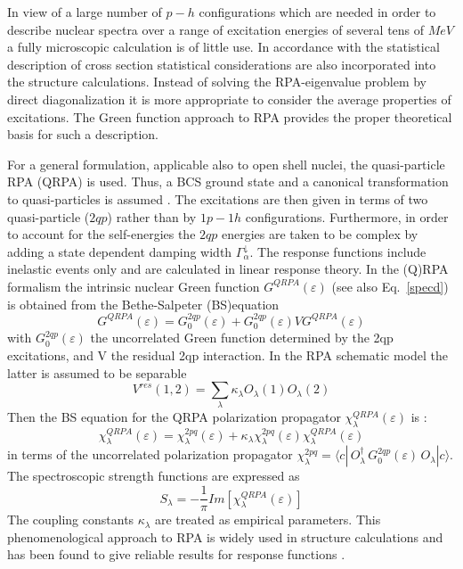 \documentclass[twocolumn,amsmath,amssymb,10pt,groupedaddress,a4paper]{revtex4}
\begin{document}
In view of a large number of $p-h$ configurations which are needed
in order to describe nuclear spectra over a range of excitation energies
of several tens of $MeV$ a fully microscopic calculation is of little
use. In accordance with the statistical description of cross section
statistical considerations are also incorporated into the structure
calculations. Instead of solving the RPA-eigenvalue problem
by direct diagonalization it is more appropriate to consider the average
properties of excitations. The Green function approach to RPA
\cite{Wal,LW92} provides the proper theoretical basis for such a
description.

For a general formulation, applicable also to open shell nuclei, the
quasi-particle RPA (QRPA) is used. Thus, a BCS ground
state and a canonical transformation to quasi-particles is assumed
\cite{RS}. The excitations are then given in terms of two quasi-particle
($2qp$) rather than by $1p-1h$ configurations. Furthermore, in order
to account for the self-energies the $2qp$ energies are taken to
be complex by adding a state dependent damping width $\Gamma_{\alpha}^{\downarrow}$.
The response functions include inelastic events only and are calculated
in linear response theory.
In the (Q)RPA formalism the intrinsic nuclear Green function $G^{QRPA}(\varepsilon)$ (see also Eq.~\ref{specd}) is obtained from the Bethe-Salpeter (BS)equation \cite{fetter}
\begin{equation}
G^{QRPA}(\varepsilon) = G_{0}^{2qp}(\varepsilon)+ G_{0}^{2qp}(\varepsilon)VG^{QRPA}(\varepsilon)\label{bs1}\end{equation}
with  $G_{0}^{2qp}(\varepsilon)$ the uncorrelated Green function determined by the 2qp excitations, and V the residual 2qp interaction. In the RPA schematic model the latter is assumed to be
separable \begin{equation}
V^{res}(1,2)=\sum_{\lambda}\kappa _{\lambda}O_{\lambda}(1)O_{\lambda}(2)
\end{equation}
Then the BS equation for the QRPA polarization propagator $\chi_{\lambda}^{QRPA}(\varepsilon)$
is \cite{TULnew}:
\begin{equation}
\chi_{\lambda}^{QRPA}(\varepsilon)=  \chi_{\lambda}^{2pq}(\varepsilon) + \kappa_{\lambda}\chi_{\lambda}^{2pq}(\varepsilon)\chi_{\lambda}^{QRPA}(\varepsilon)\label{bs2}
\end{equation}
in terms of the uncorrelated polarization propagator
$\chi_{\lambda}^{2pq} = \langle c|\,O_{\lambda}^{\dagger
}\,G_{0}^{2qp}(\varepsilon )\,O_{\lambda}|c\rangle$.
The spectroscopic strength functions are expressed as \begin{equation}
S_{\lambda} =-\frac{1}{\pi}Im[\chi_{\lambda}^{QRPA}(\varepsilon)]
\label{sprpa}
\end{equation}
The coupling constants $\kappa_{\lambda}$
are treated as empirical parameters. This phenomenological approach
to RPA is widely used in structure calculations and has
been found to give reliable results for response functions \cite{BM,Solv}.
\end{document}
